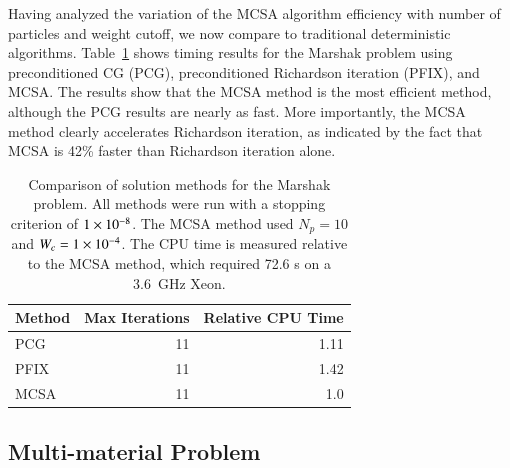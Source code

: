 \documentclass[preprint,12pt]{elsarticle}
\begin{document}
Having analyzed the variation of the MCSA algorithm efficiency with number of
particles and weight cutoff, we now compare to traditional deterministic
algorithms.  Table~\ref{tab:marshak_comparison} shows timing results for the
Marshak problem using preconditioned CG (PCG), preconditioned Richardson
iteration (PFIX), and MCSA. The results show that the MCSA method is the most
efficient method, although the PCG results are nearly as fast.  More
importantly, the MCSA method clearly accelerates Richardson iteration, as
indicated by the fact that MCSA is 42\% faster than Richardson iteration
alone.
\begin{table}[ht!]
  \caption{Comparison of solution methods for the Marshak problem. All
    methods were run with a stopping criterion of $1\times 10^{-8}$.  The
    MCSA method used $N_p=10$ and $W_c = 1\times 10^{-4}$.  The CPU time is
    measured relative to the MCSA method, which required 72.6 s on a
    3.6~GHz Xeon.}
  \label{tab:marshak_comparison}
  \begin{center}
    \begin{tabular}{lrr}\hline\hline
      \multicolumn{1}{c}{Method} & \multicolumn{1}{c}{Max Iterations}
      & \multicolumn{1}{c}{Relative CPU Time}\\\hline\hline  PCG &
      11 & 1.11 \\  PFIX & 11 & 1.42 \\  MCSA & 11 & 1.0
      \\ \hline\hline
    \end{tabular}
  \end{center}
\end{table}

\subsection{Multi-material Problem}
\end{document}
